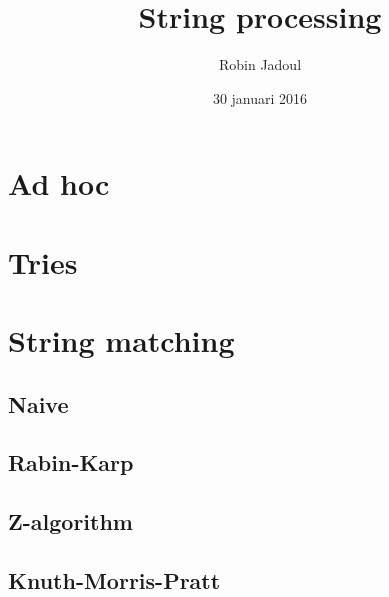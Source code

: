 \documentclass{beamer}
\title{String processing}
\author{Robin Jadoul}
\date{30 januari 2016}
\institute
{
    \texttt{[image: img/Icon.png]}
}
\begin{document}
\frame{\titlepage}

\section[Ad hoc]{Ad hoc}


\section[Tries]{Tries}


\section[String matching]{String matching}
\subsection[Naive]{Naive}

\subsection[Rabin-Karp]{Rabin-Karp}

\subsection[Z-algorithm]{Z-algorithm}

\subsection[Knuth-Morris-Pratt]{Knuth-Morris-Pratt}

\end{document}
